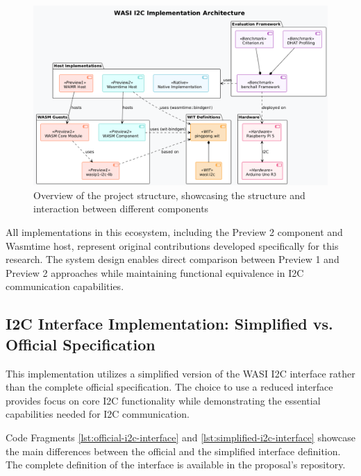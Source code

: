 \begin{figure}[h]
	\centering
	\includegraphics[width=\textwidth]{images/project schema.png}
	\caption{Overview of the project structure, showcasing the structure and interaction between different components}
	\label{fig:project_schema}
\end{figure}

All implementations in this ecosystem, including the Preview 2 component and Wasmtime host, represent original contributions developed specifically for this research. The system design enables direct comparison between Preview 1 and Preview 2 approaches while maintaining functional equivalence in I2C communication capabilities.

\subsection{I2C Interface Implementation: Simplified vs. Official Specification}

This implementation utilizes a simplified version of the WASI I2C interface rather than the complete official specification. The choice to use a reduced interface provides focus on core I2C functionality while demonstrating the essential capabilities needed for I2C communication.

Code Fragments \ref{lst:official-i2c-interface} and \ref{lst:simplified-i2c-interface} showcase the main differences between the official and the simplified interface definition. The complete definition of the interface is available in the proposal's repository. %

